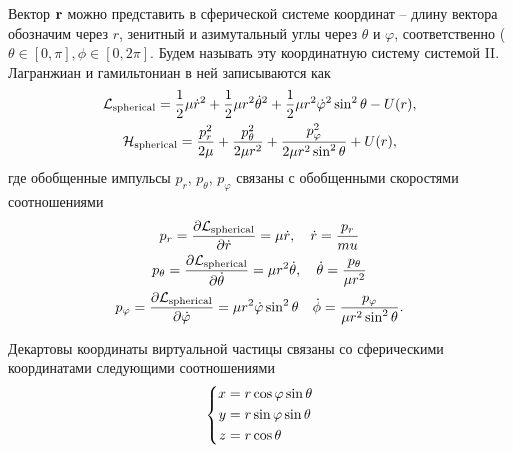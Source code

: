 Вектор $\mathbf{r}$ можно представить в сферической системе координат -- длину вектора обозначим через $r$, зенитный и азимутальный углы через $\theta$ и $\varphi$, соответственно ($\theta \in [0, \pi], \phi \in [0, 2 \pi]$. Будем называть эту координатную систему системой II. Лагранжиан и гамильтониан в ней записываются как
\begin{gather}
    \mathcal{L}_\text{spherical} = \frac{1}{2} \mu \dot{r}^2 + \frac{1}{2} \mu r^2 \dot{\theta}^2 + \frac{1}{2} \mu r^2 \dot{\varphi}^2 \sin^2 \theta - U(r),  \label{two-atom-spherical-lagrangian} \\
    \mathcal{H}_\text{spherical} = \frac{p_r^2}{2 \mu} + \frac{p_\theta^2}{2 \mu r^2} + \frac{p_\varphi^2}{2 \mu r^2 \sin^2 \theta} + U(r), \label{two-atom-spherical-hamiltonian}
\end{gather}
%
где обобщенные импульсы $p_r$, $p_\theta$, $p_\varphi$ связаны с обобщенными скоростями соотношениями
\begin{gather}
    p_r = \frac{\partial \mathcal{L}_\text{spherical}}{\partial \dot{r}} = \mu \dot{r}, \quad \dot{r} = \frac{p_r}{mu} \label{two-atom-spherical-momenta1} \\
    p_\theta = \frac{\partial \mathcal{L}_\text{spherical}}{\partial \dot{\theta}} = \mu r^2 \dot{\theta}, \quad \dot{\theta} = \frac{p_\theta}{\mu r^2} \label{two-atom-spherical-momenta2} \\
    p_\varphi = \frac{\partial \mathcal{L}_\text{spherical}}{\partial \dot{\varphi}} = \mu r^2 \dot{\varphi} \sin^2 \theta \quad \dot{\phi} = \frac{p_\varphi}{\mu r^2 \sin^2 \theta} \label{two-atom-spherical-momenta3}.
\end{gather}

Декартовы координаты виртуальной частицы связаны со сферическими координатами следующими соотношениями
\begin{gather}
    \left\{
    \begin{aligned}
        x &= r \cos \varphi \sin \theta \\
        y &= r \sin \varphi \sin \theta \\
        z &= r \cos \theta
    \end{aligned}
    \right. \label{two-atom-spherical-coordinates}
\end{gather}

